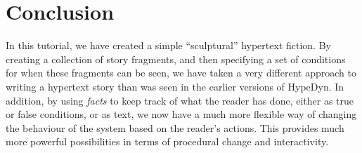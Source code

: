 \documentclass{article}
\begin{document}
\section{Conclusion}

In this tutorial, we have created a simple ``sculptural'' hypertext fiction. By creating a collection of story fragments, and then specifying a set of conditions for when these fragments can be seen, we have taken a very different approach to writing a hypertext story than was seen in the earlier versions of HypeDyn. In addition, by using \textit{facts} to keep track of what the reader has done, either as true or false conditions, or as text, we now have a much more flexible way of changing the behaviour of the system based on the reader's actions. This provides much more powerful possibilities in terms of procedural change and interactivity.

% 

  
  
\end{document}
